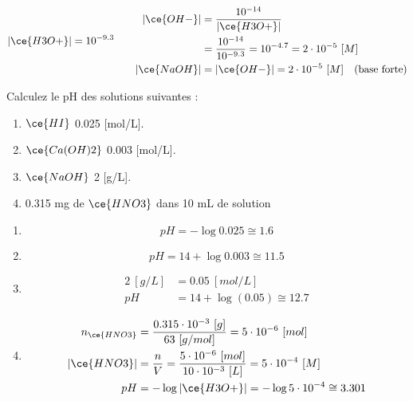\documentclass[
  11pt,
  french,
  a4paper,
  openany]{book}
\providecommand{\tightlist}{%
  \setlength{\itemsep}{0pt}\setlength{\parskip}{0pt}}
\begin{document}
\begin{Answer}
\[
\begin{split}
|\ce{H3O+}| = 10^{-9.3}
\end{split}
\qquad
\begin{split}
|\ce{OH-}| &= \frac{10^{-14}}{|\ce{H3O+}|} \\
  &= \frac{10^{-14}}{10^{-9.3}} = 10^{-4.7} = 2 \cdot 10^{-5}\ [M] \\
|\ce{NaOH}| &= |\ce{OH-}| = 2 \cdot 10^{-5}\ [M] \quad \text{(base forte)}
\end{split}
\]

\end{Answer}

\clearpage

\begin{Exercise}

Calculez le pH des solutions suivantes :

\begin{enumerate}
\def\labelenumi{\alph{enumi}.}
\tightlist
\item
  \(\ce{HI}\) 0.025 {[}mol/L{]}.
\item
  \(\ce{Ca(OH)2}\) 0.003 {[}mol/L{]}.
\item
  \(\ce{NaOH}\) 2 {[}g/L{]}.
\item
  0.315 mg de \(\ce{HNO3}\) dans 10 mL de solution
\end{enumerate}


\end{Exercise}

\begin{Answer}

\begin{enumerate}
\def\labelenumi{\alph{enumi}.}
\tightlist
\item
  \[
  pH = - \log 0.025 \cong 1.6
  \]
\item
  \[
  pH = 14 + \log 0.003 \cong 11.5
  \]
\item
  \[
  \begin{split}
    2\ [g/L] &= 0.05\ [mol/L] \\
    pH &= 14 + \log(0.05) \cong 12.7
  \end{split}
  \]
\item
  \[
  \begin{split}
    n_{\ce{HNO3}} &= \frac{0.315 \cdot 10^{-3}\ [g]}{63\ [g/mol]} = 5 \cdot 10^{-6}\ [mol] \\
    |\ce{HNO3}| &= \frac{n}{V} = \frac{5 \cdot 10^{-6}\ [mol]}{10 \cdot 10^{-3}\ [L]} = 5 \cdot 10^{-4}\ [M] \\
    pH &= - \log |\ce{H3O+}| = - \log 5 \cdot 10^{-4} \cong 3.301
   \end{split}
  \]
\end{enumerate}


\end{Answer}
\end{document}
